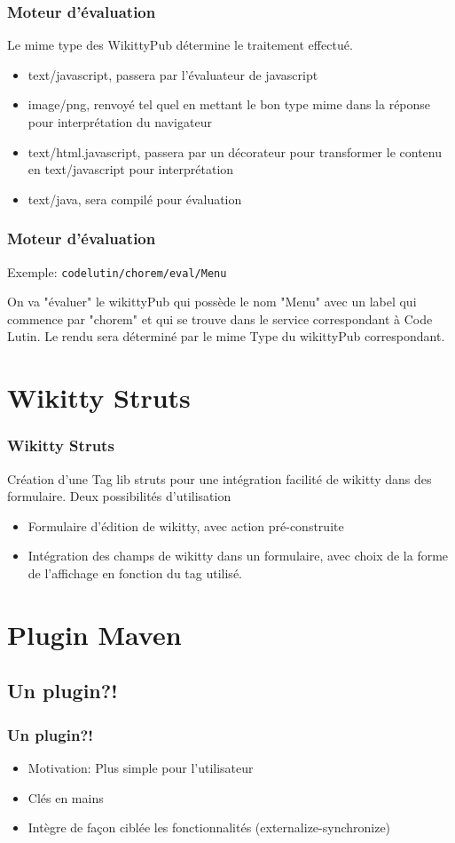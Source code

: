 \documentclass[12pt,a4paper,utf8x]{beamer}
\begin{document}
\begin{frame}\frametitle{Moteur d'évaluation}
Le mime type des WikittyPub détermine le traitement effectué.
\begin{itemize}
\item text/javascript, passera par l'évaluateur de javascript
\item image/png, renvoyé tel quel en mettant le bon type mime dans la réponse 
pour interprétation du navigateur
\item text/html.javascript, passera par un décorateur pour transformer le contenu
en text/javascript pour interprétation
\item text/java, sera compilé pour évaluation
\end{itemize}
\end{frame}

\begin{frame}\frametitle{Moteur d'évaluation}

Exemple:
\verb!codelutin/chorem/eval/Menu! 

On va "évaluer" le wikittyPub qui possède le nom "Menu" avec un label qui
commence par "chorem" et qui se trouve dans le service correspondant à Code Lutin.
Le rendu sera déterminé par le mime Type du wikittyPub correspondant.
\end{frame}





\section{Wikitty Struts} 
\begin{frame}\frametitle{Wikitty Struts}
Création d'une Tag lib struts pour une intégration facilité de wikitty dans des 
formulaire.
Deux possibilités d'utilisation
\begin{itemize}
\item Formulaire d'édition de wikitty, avec action pré-construite 
\item Intégration des champs de wikitty dans un formulaire, avec choix de la forme
de l'affichage en fonction du tag utilisé.
\end{itemize}

\end{frame}


\section{Plugin Maven}
\subsection*{Un plugin?!}
\begin{frame}\frametitle{Un plugin?!}
\begin{itemize}
\item Motivation: Plus simple pour l'utilisateur
\item Clés en mains
\item Intègre de façon ciblée les fonctionnalités (externalize-synchronize)
\end{itemize}
\end{frame}	
\end{document}
